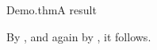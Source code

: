 \documentclass{article}
\begin{document}
\begin{leanblock}[view=prose]{Demo.thm}{A result}
\end{leanblock}
By , and again by , it follows.
\end{document}
